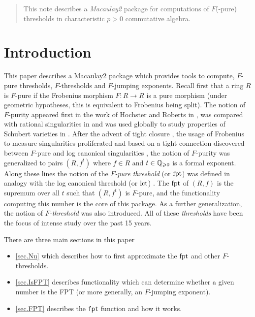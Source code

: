 \documentclass{amsart}
\renewcommand{\geq}{\geqslant}
\begin{document}
\begin{abstract}
	This note describes a \emph{Macaulay2} package for computations of $F$(-pure) thresholds in characteristic $p > 0$ commutative algebra.  
\end{abstract}




\maketitle

\section{Introduction}

This paper describes a Macaulay2 package which provides tools to compute, $F$-pure thresholds, $F$-thresholds and $F$-jumping exponents.  Recall first that a ring $R$ is $F$-pure if the Frobenius morphism $F : R \to R$ is a pure morphism (under geometric hypotheses, this is equivalent to Frobenius being split).  The notion of $F$-purity appeared first in the work of Hochster and Roberts in \cite{HochsterRobertsFrobeniusLocalCohomology}, was compared with rational singularities in \cite{FedderFPureRat} and was used globally to study properties of Schubert varieties in \cite{MehtaRamanathanFrobeniusSplittingAndCohomologyVanishing}.  After the advent of tight closure \cite{HochsterHunekeTC1}, the usage of Frobenius to measure singularities proliferated and based on a tight connection discovered between $F$-pure and log canonical singularities \cite{HaraWatanabeFRegFPure}, the notion of $F$-purity was generalized to pairs $(R, f^t)$ where $f \in R$ and $t \in \bQ_{\geq 0}$ is a formal exponent.  Along these lines the notion of the \emph{$F$-pure threshold} (or $\operatorname{{fpt}}$) was defined in analogy with the log canonical threshold (or $\operatorname{{lct}}$) \cite{TakagiWatanabeFPureThresh,MustataTakagiWatanabeFThresholdsAndBernsteinSato}.  The $\operatorname{{fpt}}$ of $(R, f)$ is the supremum over all $t$ such that $(R, f^t)$ is $F$-pure, and the functionality computing this number is the core of this package.    As a further generalization, the notion of \emph{$F$-threshold} was also introduced.  All of these \emph{thresholds} have been the focus of intense study over the past 15 years.

There are three main sections in this paper
\begin{itemize}
\item{} \autoref{sec.Nu} which describes how to first approximate the $\operatorname{{fpt}}$ and other $F$-thresholds.  
\item{} \autoref{sec.IsFPT} describes functionality which can determine whether a given number is the FPT (or more generally, an $F$-jumping exponent).
\item{} \autoref{sec.FPT} describes the {\tt fpt} function and how it works.
\end{itemize}
\end{document}
